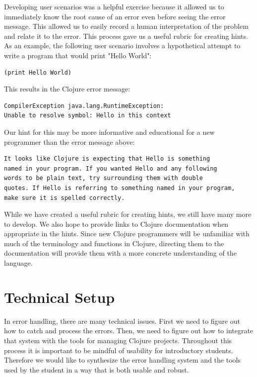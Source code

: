 \documentclass[12pt]{article}
\begin{document}
Developing user scenarios was a helpful exercise because it allowed us to immediately know the root cause of an error even before seeing the error message.
This allowed us to easily record a human interpretation of the problem and relate it to the error. This process gave us a useful rubric for creating hints. As an example, the following user scenario involves a hypothetical attempt to write a program that would print "Hello World":

\begin{verbatim}
(print Hello World)
\end{verbatim}

This results in the Clojure error message:
\begin{verbatim}
CompilerException java.lang.RuntimeException:
Unable to resolve symbol: Hello in this context
\end{verbatim}

Our hint for this may be more informative and educational for a new programmer than the error message above:

\begin{verbatim}
It looks like Clojure is expecting that Hello is something
named in your program. If you wanted Hello and any following
words to be plain text, try surrounding them with double
quotes. If Hello is referring to something named in your program,
make sure it is spelled correctly.
\end{verbatim}

While we have created a useful rubric for creating hints, we still have many more to develop.
We also hope to provide links to Clojure documentation when appropriate in the hints.
Since new Clojure programmers will be unfamiliar with much of the terminology and functions in Clojure, directing them to the documentation will provide them with a more concrete understanding of the language.

\section{Technical Setup}\label{sec:technical}
In error handling, there are many technical issues. First we need to figure out how to catch and process the errors. Then, we need to figure out how to integrate that system with the tools for managing Clojure projects. Throughout this process it is important to be mindful of usability for introductory students. Therefore we would like to synthesize the error handling system and the tools used by the student in a way that is both usable and robust.
\end{document}
